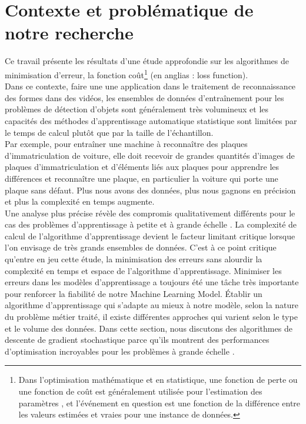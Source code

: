 		

	\section{Contexte et problématique de notre recherche}
	
		Ce travail présente les résultats d'une étude approfondie sur les algorithmes de minimisation d’erreur, la fonction coût\footnote{Dans l'optimisation mathématique et en statistique, une fonction de perte ou une fonction de coût est généralement utilisée pour l'estimation des paramètres , et l'événement en question est une fonction de la différence entre les valeurs estimées et vraies pour une instance de données.} (en anglias : loss function). \\
		
		Dans ce contexte, faire une une application dans le traitement de reconnaissance des formes dans des vidéos, les ensembles de données d'entraînement pour les  problèmes de détection d'objets sont généralement très volumineux et les capacités des méthodes d'apprentissage automatique statistique sont limitées par le temps de calcul plutôt que par la taille de l'échantillon\cite{bottou2010large}.\\
		Par exemple, pour entraîner une machine à reconnaître des plaques d'immatriculation de voiture, elle doit recevoir de grandes quantités d'images de plaques d'immatriculation et d'éléments liés aux plaques pour apprendre les différences et reconnaître une plaque, en particulier la voiture qui porte une plaque sans défaut. Plus nous avons des données, plus nous gagnons en précision et plus la complexité en temps augmente.\\
		
		Une analyse plus précise révèle des compromis qualitativement différents pour le cas des problèmes d'apprentissage à petite et à grande échelle \cite{bottou2010large}. La complexité de calcul de l'algorithme d'apprentissage devient le facteur limitant critique lorsque l'on envisage de très grands ensembles de données. C'est à ce point critique qu'entre en jeu cette étude, la minimisation des erreurs sans alourdir la complexité en temps et espace de l’algorithme d’apprentissage. Minimiser les erreurs dans les modèles d’apprentissage a toujours été une tâche très importante pour renforcer la fiabilité de notre Machine Learning Model\cite{ibm2018ml}. Établir un algorithme d’apprentissage qui s'adapte au mieux à notre modèle, selon la nature du problème métier traité, il existe différentes approches qui varient selon le type et le volume des données. Dans cette section, nous discutons des algorithmes de descente de gradient stochastique parce qu’ils montrent des performances  d'optimisation incroyables pour les problèmes à grande échelle \cite{bottou2010large}.\\
		
